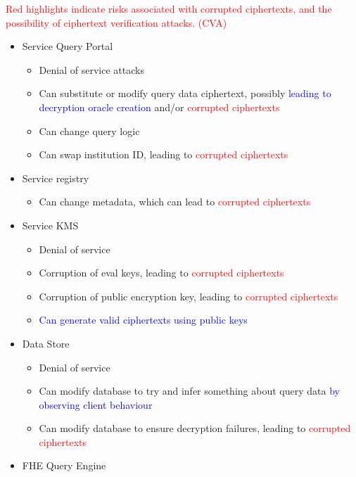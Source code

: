 \textcolor{red} {Red highlights indicate risks associated with corrupted ciphertexts, and the possibility of ciphertext verification attacks. (CVA)}
\begin{itemize}
    \item Service Query Portal
          \begin{itemize}
              \item Denial of service attacks
              \item Can substitute or modify query data ciphertext, possibly \textcolor{blue}{leading to decryption oracle creation} and/or \textcolor{red}{corrupted ciphertexts}
              \item Can change query logic
              \item Can swap institution ID, leading to \textcolor{red}{corrupted ciphertexts}
          \end{itemize}
    \item Service registry
          \begin{itemize}
              \item Can change metadata, which can lead to \textcolor{red}{corrupted ciphertexts}
          \end{itemize}
    \item Service KMS
          \begin{itemize}
              \item Denial of service
              \item Corruption of eval keys, leading to \textcolor{red}{corrupted ciphertexts }
              \item Corruption of public encryption key, leading to \textcolor{red}{corrupted ciphertexts}
              \item \textcolor{blue}{Can generate valid ciphertexts using public keys}
          \end{itemize}
    \item Data Store
          \begin{itemize}
              \item Denial of service
              \item Can modify database to try and infer something about query data \textcolor{blue}{by observing client behaviour}
              \item Can modify database to ensure decryption failures, leading to \textcolor{red}{corrupted ciphertexts}
          \end{itemize}
    \item FHE Query Engine

\end{itemize}
